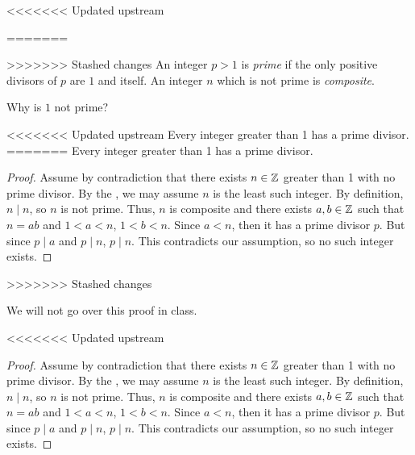 \documentclass{ximera}
\begin{document}
<<<<<<< Updated upstream
\begin{defn}
=======
\begin{defn}\label{defn:prime-composite}
>>>>>>> Stashed changes
An integer $p>1$ is \emph{prime} if the only positive divisors of $p$ are $1$ and itself. An integer $n$ which is not prime is \emph{composite}. 
\end{defn}

Why is $1$ not prime?


\begin{lemma}\label{lem:prime-composite}
<<<<<<< Updated upstream
 Every integer greater than 1 has a prime divisor.
=======
  Every integer greater than 1 has a prime divisor.
  \begin{proof} 
    Assume by contradiction that there exists $n\in\mathbb Z$ greater than 1 with no prime divisor. By the , we may assume $n$ is the least such integer. By definition, $n\mid n$, so $n$ is not prime. Thus, $n$ is composite and there exists $a,b\in\mathbb Z$ such that $n=ab$ and $1<a<n$, $1<b<n$. Since $a<n$, then it has a prime divisor $p$. But since $p\mid a$ and $p\mid n$, $p\mid n$. This contradicts our assumption, so no such integer exists.
  \end{proof}
>>>>>>> Stashed changes
\end{lemma}

We will not go over this proof in class.

<<<<<<< Updated upstream
\begin{proof} 
 Assume by contradiction that there exists $n\in\mathbb Z$ greater than 1 with no prime divisor. By the , we may assume $n$ is the least such integer. By definition, $n\mid n$, so $n$ is not prime. Thus, $n$ is composite and there exists $a,b\in\mathbb Z$ such that $n=ab$ and $1<a<n$, $1<b<n$. Since $a<n$, then it has a prime divisor $p$. But since $p\mid a$ and $p\mid n$, $p\mid n$. This contradicts our assumption, so no such integer exists.
\end{proof}



\end{defn}
\end{document}
